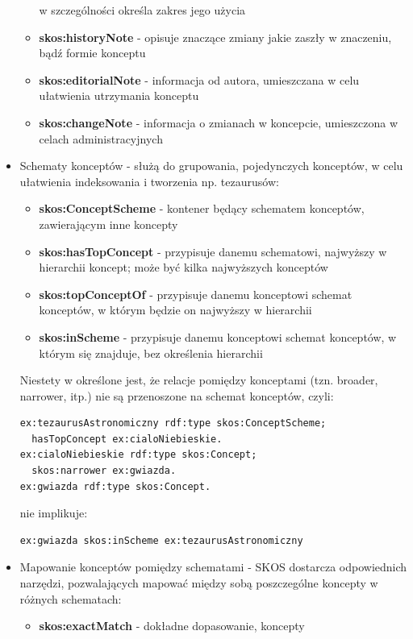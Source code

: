 \documentclass[12pt,a4paper,notitlepage]{article}
\begin{document}
\begin{itemize}
\begin{itemize}
        w szczególności określa zakres jego użycia
      \item \textbf{skos:historyNote} - opisuje znaczące zmiany jakie zaszły w 
        znaczeniu, bądź formie konceptu
      \item \textbf{skos:editorialNote} - informacja od autora, umieszczana 
        w celu ułatwienia utrzymania konceptu
      \item \textbf{skos:changeNote} - informacja o zmianach w koncepcie,
        umieszczona w celach administracyjnych
    \end{itemize}
  \item Schematy konceptów - służą do grupowania, pojedynczych konceptów, w
    celu ułatwienia indeksowania i tworzenia np. tezaurusów:
    \begin{itemize}
      \item \textbf{skos:ConceptScheme} - kontener będący schematem konceptów,
        zawierającym inne koncepty
      \item \textbf{skos:hasTopConcept} - przypisuje danemu schematowi,
        najwyższy w hierarchii koncept; może być kilka najwyższych konceptów
      \item \textbf{skos:topConceptOf} - przypisuje danemu konceptowi
        schemat konceptów, w którym będzie on najwyższy w hierarchii
      \item \textbf{skos:inScheme} - przypisuje danemu konceptowi schemat
        konceptów, w którym się znajduje, bez określenia hierarchii
    \end{itemize}
    Niestety w \cite{SKOS-ref} określone jest, że relacje pomiędzy konceptami
    (tzn. broader, narrower, itp.) nie są przenoszone na schemat konceptów,
    czyli:
\begin{verbatim}
ex:tezaurusAstronomiczny rdf:type skos:ConceptScheme;
  hasTopConcept ex:cialoNiebieskie.
ex:cialoNiebieskie rdf:type skos:Concept;
  skos:narrower ex:gwiazda.
ex:gwiazda rdf:type skos:Concept.
\end{verbatim}
    nie implikuje:
\begin{verbatim}
ex:gwiazda skos:inScheme ex:tezaurusAstronomiczny
\end{verbatim}
    \item Mapowanie konceptów pomiędzy schematami - SKOS dostarcza odpowiednich
      narzędzi, pozwalających mapować między sobą poszczególne koncepty w 
      różnych schematach:
      \begin{itemize}
        \item \textbf{skos:exactMatch} - dokładne dopasowanie, koncepty

\end{itemize}
\end{itemize}
\end{document}
